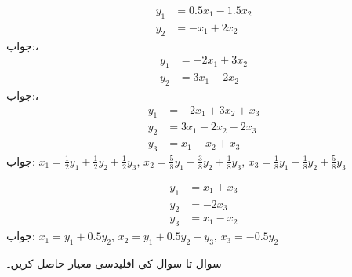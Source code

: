\begin{align*}
y_1&=0.5x_1-1.5x_2\\
y_2&=-x_1+2x_2
\end{align*}
جواب:، 
\begin{align*}
y_1&=-2x_1+3x_2\\
y_2&=3x_1-2x_2
\end{align*}
جواب:، 
\begin{align*}
y_1&=-2x_1+3x_2+x_3\\
y_2&=3x_1-2x_2-2x_3\\
y_3&=x_1-x_2+x_3
\end{align*}
جواب:
\begin{math}
x_1=\tfrac{1}{2}y_1+\tfrac{1}{2}y_2+\tfrac{1}{2}y_3, \, 
x_2=\tfrac{5}{8}y_1+\tfrac{3}{8}y_2+\tfrac{1}{8}y_3,\,
x_3=\tfrac{1}{8}y_1-\tfrac{1}{8}y_2+\tfrac{5}{8}y_3
\end{math}

\begin{align*}
y_1&=x_1+x_3\\
y_2&=-2x_3\\
y_3&=x_1-x_2
\end{align*}
جواب:
\begin{math}
x_1=y_1+0.5y_2, \, 
x_2=y_1+0.5y_2-y_3,\,
x_3=-0.5y_2
\end{math}

سوال  تا سوال  کی اقلیدسی معیار حاصل کریں۔

